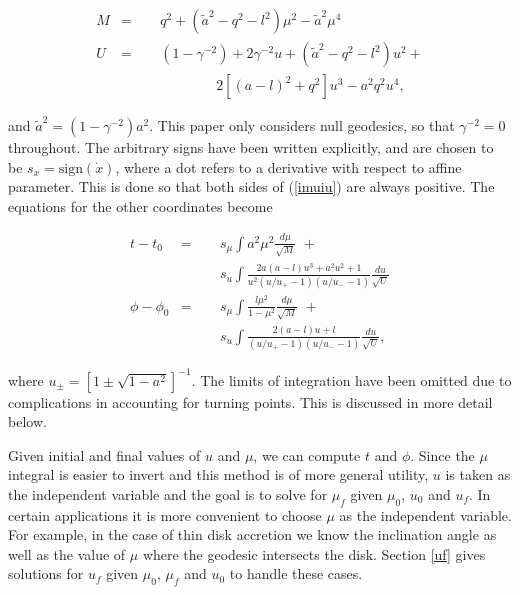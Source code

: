 \documentclass[apj]{emulateapj}
\begin{document}
\begin{eqnarray}
M &=& q^2+(\tilde{a}^2-q^2-l^2)\mu^2-\tilde{a}^2\mu^4\\ 
U &=& (1-\gamma^{-2})+2\gamma^{-2}u+(\tilde{a}^2-q^2-l^2)u^2 + \nonumber\\
&\qquad&\qquad\qquad 2[(a-l)^2+q^2]u^3-a^2q^2u^4,
\end{eqnarray}

\noindent and  $\tilde{a}^2=(1-\gamma^{-2})a^2$. This paper only considers null geodesics, so that $\gamma^{-2}=0$ throughout. The arbitrary signs have been written explicitly, and are chosen to be $s_x=\mathrm{sign}(\dot{x})$, where a dot refers to a derivative with respect to affine parameter. This is done so that both sides of (\ref{imuiu}) are always positive. The equations for the other coordinates become

\begin{eqnarray}
\nonumber t-t_0&=&s_\mu\int a^2\mu^2\frac{d\mu}{\sqrt{M}} \hspace{4pt}+ \\
      \label{teqn} &\qquad& s_u\int \frac{2a(a-l)u^3+a^2u^2+1}{u^2(u/u_+-1)(u/u_--1)} \frac{du}{\sqrt{U}} \\
\nonumber \phi-\phi_0&=&s_\mu\int \frac{l\mu^2}{1-\mu^2}\frac{d\mu}{\sqrt{M}}\hspace{4pt} + \\
     \label{peqn} &\qquad& s_u\int \frac{2(a-l)u+l}{(u/u_+-1)(u/u_--1)} \frac{du}{\sqrt{U}},
\end{eqnarray}

\noindent where $u_{\pm} = [1\pm\sqrt{1-a^2}]^{-1}$. The limits of integration have been omitted due to complications in accounting for turning points. This is discussed in more detail below.

Given initial and final values of $u$ and $\mu$, we can compute $t$ and $\phi$. Since the $\mu$ integral is easier to invert and this method is of more general utility, $u$ is taken as the independent variable and the goal is to solve for $\mu_f$ given $\mu_0$, $u_0$ and $u_f$. In certain applications it is more convenient to choose $\mu$ as the independent variable. For example, in the case of thin disk accretion we know the inclination angle as well as the value of $\mu$ where the geodesic intersects the disk. Section \ref{uf} gives solutions for $u_f$ given $\mu_0$, $\mu_f$ and $u_0$ to handle these cases.
\end{document}
